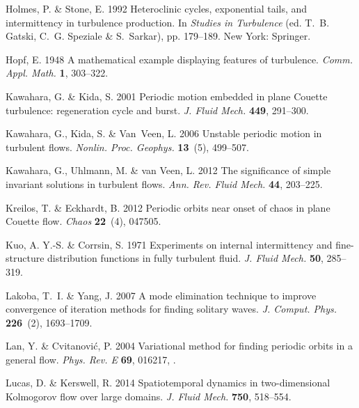 \documentclass{article}
\begin{document}
\begin{thebibliography}{68}
{\sc Holmes, P. \& Stone, E.} 1992 Heteroclinic cycles, exponential tails, and
  intermittency in turbulence production. In {\em Studies in Turbulence\/} (ed.
  T.~B. Gatski, C.~G. Speziale \& S.~Sarkar), pp. 179--189. New York: Springer.

{\sc Hopf, E.} 1948 A mathematical example displaying features of turbulence.
  {\em Comm. Appl. Math.\/} {\bf 1}, 303--322.

{\sc Kawahara, G. \& Kida, S.} 2001 Periodic motion embedded in plane {C}ouette
  turbulence: regeneration cycle and burst. {\em J. Fluid Mech.\/} {\bf 449},
  291--300.

{\sc Kawahara, G., Kida, S. \& Van~Veen, L.} 2006 Unstable periodic motion in
  turbulent flows. {\em Nonlin. Proc. Geophys.\/} {\bf 13}~(5), 499--507.

{\sc Kawahara, G., Uhlmann, M. \& van Veen, L.} 2012 The significance of simple
  invariant solutions in turbulent flows. {\em Ann. Rev. Fluid Mech.\/} {\bf
  44}, 203--225.

{\sc Kreilos, T. \& Eckhardt, B.} 2012 Periodic orbits near onset of chaos in
  plane {C}ouette flow. {\em Chaos\/} {\bf 22}~(4), 047505.

{\sc Kuo, A. Y.-S. \& Corrsin, S.} 1971 Experiments on internal intermittency
  and fine-structure distribution functions in fully turbulent fluid. {\em J.
  Fluid Mech.\/} {\bf 50}, 285--319.

{\sc Lakoba, T.~I. \& Yang, J.} 2007 A mode elimination technique to improve
  convergence of iteration methods for finding solitary waves. {\em J. Comput.
  Phys.\/} {\bf 226}~(2), 1693--1709.

{\sc Lan, Y. \& Cvitanovi\'{c}, P.} 2004 Variational method for finding
  periodic orbits in a general flow. {\em Phys. Rev. E\/} {\bf 69}, 016217,
  .

{\sc Lucas, D. \& Kerswell, R.} 2014 Spatiotemporal dynamics in two-dimensional
  {Kolmogorov} flow over large domains. {\em J. Fluid Mech.\/} {\bf 750},
  518--554.


\end{thebibliography}
\end{document}
